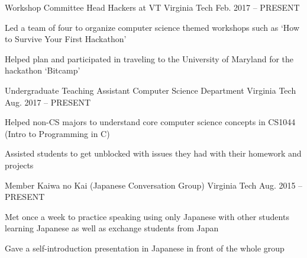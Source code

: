 

\begin{cventries}

  \cventry
    {Workshop Committee Head} %
    {Hackers at VT} %
    {Virginia Tech} %
    {Feb. 2017 – PRESENT} %
    {
      \begin{cvitems} %
        \item {Led a team of four to organize computer science themed workshops such as `How to Survive Your First Hackathon'}
        \item {Helped plan and participated in traveling to the University of Maryland for the hackathon `Bitcamp'}
      \end{cvitems}
    }

  \cventry
    {Undergraduate Teaching Assistant} %
    {Computer Science Department} %
    {Virginia Tech} %
    {Aug. 2017 – PRESENT} %
    {
      \begin{cvitems} %
        \item {Helped non-CS majors to understand core computer science concepts in CS1044 (Intro to Programming in C)}
        \item {Assisted students to get unblocked with issues they had with their homework and projects}
      \end{cvitems}
    }

  \cventry
    {Member} %
    {Kaiwa no Kai (Japanese Conversation Group)} %
    {Virginia Tech} %
    {Aug. 2015 – PRESENT} %
    {
      \begin{cvitems} %
        \item {Met once a week to practice speaking using only Japanese with other students learning Japanese as well as exchange students from Japan}
        \item {Gave a self-introduction presentation in Japanese in front of the whole group}
      \end{cvitems}
    }

\end{cventries}
